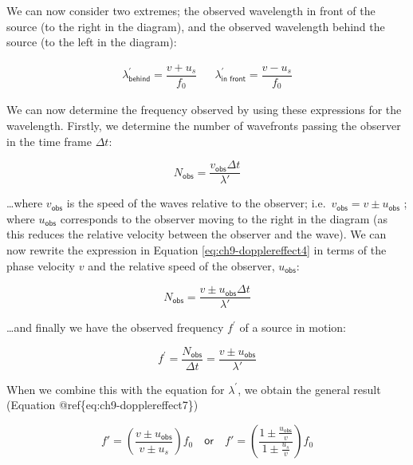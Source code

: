 \documentclass[
]{book}
\begin{document}
We can now consider two extremes; the observed wavelength in front of the source (to the right in the diagram), and the observed wavelength behind the source (to the left in the diagram):

\begin{equation}
\begin{array}{rcl}
\lambda^\prime_{\textsf{behind}} = \dfrac{v+u_{s}}{f_{0}} && \lambda^\prime_{\textsf{in front}} = \dfrac{v-u_{s}}{f_{0}}
\end{array}
\label{eq:ch9-dopplereffect3}
\end{equation}

We can now determine the frequency observed by using these expressions for the wavelength. Firstly, we determine the number of wavefronts passing the observer in the time frame \(\Delta t\):

\begin{equation}
N_{\textsf{obs}} = \frac{v_{\textsf{obs}}\Delta t}{\lambda'}
\label{eq:ch9-dopplereffect4}
\end{equation}

\ldots where \(v_{\textsf{obs}}\) is the speed of the waves relative to the observer; i.e.~\(v_{\textsf{obs}} = v \pm u_{\textsf{obs}}\) ; where \(u_{\textsf{obs}}\) corresponds to the observer moving to the right in the diagram (as this reduces the relative velocity between the observer and the wave). We can now rewrite the expression in Equation \eqref{eq:ch9-dopplereffect4} in terms of the phase velocity \(v\) and the relative speed of the observer, \(u_{\textsf{obs}}\):

\begin{equation}
N_{\textsf{obs}} = \frac{v \pm u_{\textsf{obs}}\Delta t}{\lambda'}
\label{eq:ch9-dopplereffect5}
\end{equation}

\ldots and finally we have the observed frequency \(f^\prime\) of a source in motion:

\begin{equation}
f^\prime = \frac{N_{\textsf{obs}}}{\Delta t} = \frac{v\pm u_{\textsf{obs}}}{\lambda'}
\label{eq:ch9-dopplereffect6}
\end{equation}

When we combine this with the equation for \(\lambda^\prime\), we obtain the general result (Equation @ref\{eq:ch9-dopplereffect7\})

\begin{equation}
f' = \left(\frac{v\pm u_{\textsf{obs}}}{v\pm u_{s}}\right)f_{0}\quad\textsf{or}\quad f' = \left(\frac{1\pm \frac{u_{\textsf{obs}}}{v}}{1\pm \frac{u_{s}}{v}}\right)f_{0}
\label{eq:ch9-dopplereffect7}
\end{equation}
\end{document}
